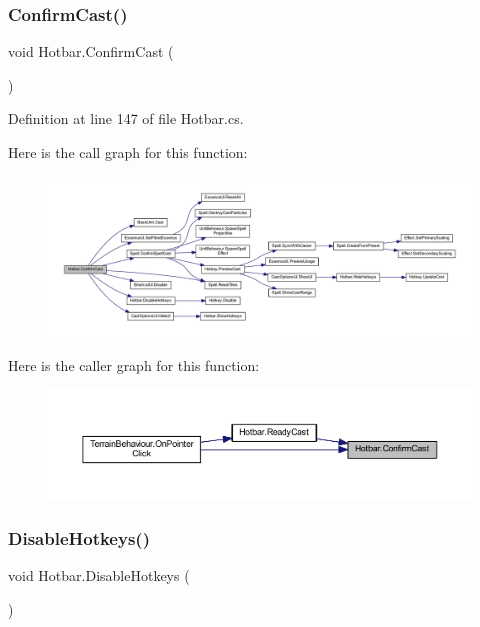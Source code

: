 \subsubsection{\texorpdfstring{ConfirmCast()}{ConfirmCast()}}
{\footnotesize\ttfamily void Hotbar.\+Confirm\+Cast (\begin{DoxyParamCaption}{ }\end{DoxyParamCaption})}



Definition at line 147 of file Hotbar.\+cs.

Here is the call graph for this function\+:
\nopagebreak
\begin{figure}[H]
\begin{center}
\leavevmode
\includegraphics[width=350pt]{class_hotbar_a535ef71789d10c417b86bdd194e3e5b7_cgraph}
\end{center}
\end{figure}
Here is the caller graph for this function\+:
\nopagebreak
\begin{figure}[H]
\begin{center}
\leavevmode
\includegraphics[width=350pt]{class_hotbar_a535ef71789d10c417b86bdd194e3e5b7_icgraph}
\end{center}
\end{figure}
\mbox{\label{class_hotbar_a914ca0c61c4d64b0bde6e829064f71a9}} 
\subsubsection{\texorpdfstring{DisableHotkeys()}{DisableHotkeys()}}
{\footnotesize\ttfamily void Hotbar.\+Disable\+Hotkeys (\begin{DoxyParamCaption}{ }\end{DoxyParamCaption})}



